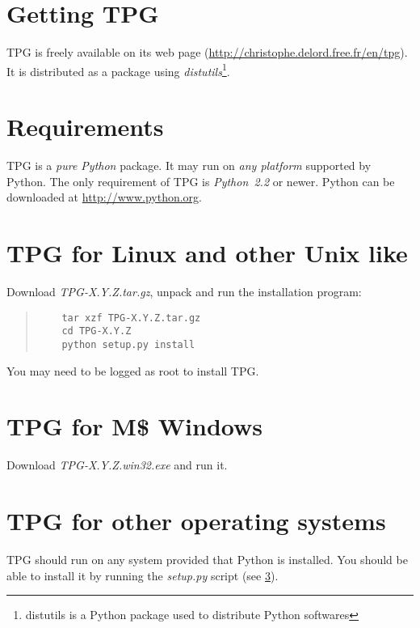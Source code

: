 
\section{Getting TPG}

TPG is freely available on its web page (\url{http://christophe.delord.free.fr/en/tpg}). It is distributed as a package using \emph{distutils}\footnote{distutils is a Python package used to distribute Python softwares}.

\section{Requirements}

TPG is a \emph{pure Python} package.
It may run on \emph{any platform} supported by Python.
The only requirement of TPG is \emph{Python~2.2} or newer. Python can be downloaded at \url{http://www.python.org}.

\section{TPG for Linux and other Unix like}					\label{linux_install}

Download \mbox{\emph{TPG-X.Y.Z.tar.gz}}, unpack and run the installation program:
\begin{quote}
\begin{verbatim}
	tar xzf TPG-X.Y.Z.tar.gz
	cd TPG-X.Y.Z
	python setup.py install
\end{verbatim}
\end{quote}
You may need to be logged as root to install TPG.

\section{TPG for M\$ Windows}

Download \mbox{\emph{TPG-X.Y.Z.win32.exe}} and run it.

\section{TPG for other operating systems}

TPG should run on any system provided that Python is installed. You should be able to install it by running the \mbox{\emph{setup.py}} script (see \ref{linux_install}).
